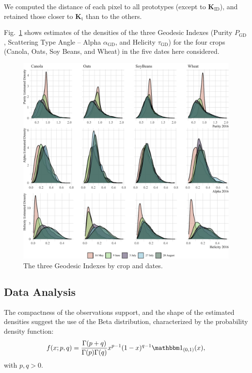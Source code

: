 \documentclass[journal]{IEEEtran}
\begin{document}
We computed the distance of each pixel to all prototypes (except to $\bm K_{\text{ID}}$), and retained those closer to $\bm K_{\text{t}}$ than to the others.

Fig.~\ref{fig:AllIndexes} shows estimates of the densities of the three Geodesic Indexes (Purity $P_{\text{GD}}$, Scattering Type Angle -- Alpha $\alpha_{\text{GD}}$, and Helicity $\tau_{\text{GD}}$) for the four crops (Canola, Oats, Soy Beans, and Wheat) in the five dates here considered.

\begin{figure}[htb]
\centering
\includegraphics[width=\linewidth]{Indexes}
\caption{The three Geodesic Indexes by crop and dates.}\label{fig:AllIndexes}
\end{figure}

\subsection{Data Analysis}

The compactness of the observations support, and the shape of the estimated densities suggest the use of the Beta distribution, characterized by the probability density function:
\begin{equation}
f(x; p, q) = \frac{\Gamma(p+q)}{\Gamma(p)\Gamma(q)} x^{p-1} (1-x)^{q-1} \mathbbm 1_{(0,1)}(x),
\label{eq:BetaDensity}
\end{equation}
with $p,q>0$.
\end{document}
